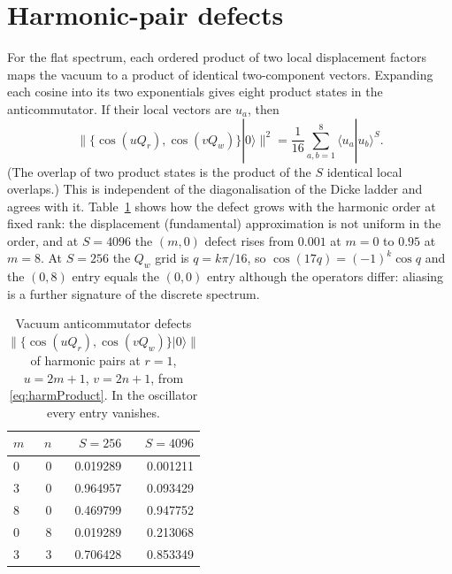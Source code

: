 \documentclass[11pt,a4paper]{article}
\newcommand{\ket}[1]{|#1\rangle}
\begin{document}
\section{Harmonic-pair defects}
\label{app:harmonics}
For the flat spectrum, each ordered product of two local displacement factors maps the vacuum to a product of identical two-component vectors. Expanding each cosine into its two exponentials gives eight product states in the anticommutator. If their local vectors are $u_a$, then
\begin{equation}
\big\|\{\cos(uQ_r),\cos(vQ_w)\}\ket0\big\|^2
=\frac1{16}\sum_{a,b=1}^{8}\langle u_a|u_b\rangle^S.
\label{eq:harmProduct}
\end{equation}
(The overlap of two product states is the product of the $S$ identical local overlaps.) This is independent of the diagonalisation of the Dicke ladder and agrees with it. Table~\ref{tab:harm} shows how the defect grows with the harmonic order at fixed rank: the displacement (fundamental) approximation is not uniform in the order, and at $S=4096$ the $(m,0)$ defect rises from $0.001$ at $m=0$ to $0.95$ at $m=8$. At $S=256$ the $Q_w$ grid is $q=k\pi/16$, so $\cos(17q)=(-1)^k\cos q$ and the $(0,8)$ entry equals the $(0,0)$ entry although the operators differ: aliasing is a further signature of the discrete spectrum.
\begin{table}[h]
\centering\small
\begin{tabular}{lrrr}
\toprule
$m$ & $n$ & $S=256$ & $S=4096$\\
\midrule
0 & 0 & 0.019289 & 0.001211\\
3 & 0 & 0.964957 & 0.093429\\
8 & 0 & 0.469799 & 0.947752\\
0 & 8 & 0.019289 & 0.213068\\
3 & 3 & 0.706428 & 0.853349\\
\bottomrule
\end{tabular}
\caption{Vacuum anticommutator defects $\|\{\cos(uQ_r),\cos(vQ_w)\}\ket0\|$ of harmonic pairs at $r=1$, $u=2m+1$, $v=2n+1$, from \eqref{eq:harmProduct}. In the oscillator every entry vanishes.}
\label{tab:harm}
\end{table}
\end{document}
